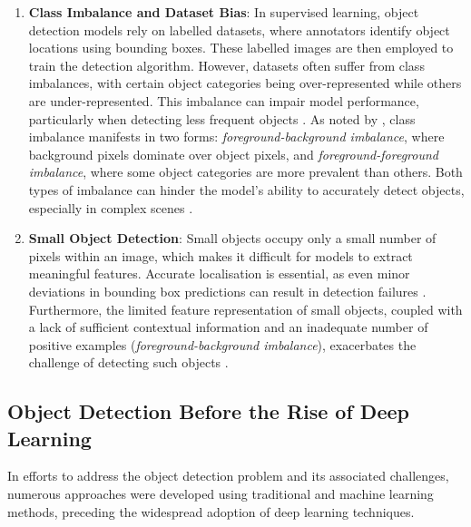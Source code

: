 \begin{enumerate}[label=\textbf{\arabic*.}]
    \item \textbf{Class Imbalance and Dataset Bias}: In supervised learning, object detection models rely on labelled datasets, where annotators identify object locations using bounding boxes. These labelled images are then employed to train the detection algorithm. However, datasets often suffer from class imbalances, with certain object categories being over-represented while others are under-represented. This imbalance can impair model performance, particularly when detecting less frequent objects \cite{od_survey_problems}. As noted by \cite{imbalance}, class imbalance manifests in two forms: \textit{foreground-background imbalance}, where background pixels dominate over object pixels, and \textit{foreground-foreground imbalance}, where some object categories are more prevalent than others. Both types of imbalance can hinder the model’s ability to accurately detect objects, especially in complex scenes \cite{od_survey_problems, imbalance}.

    \item \textbf{Small Object Detection}: Small objects occupy only a small number of pixels within an image, which makes it difficult for models to extract meaningful features. Accurate localisation is essential, as even minor deviations in bounding box predictions can result in detection failures \cite{od_survey_problems}. Furthermore, the limited feature representation of small objects, coupled with a lack of sufficient contextual information and an inadequate number of positive examples (\textit{foreground-background imbalance}), exacerbates the challenge of detecting such objects \cite{small_detection_survey, four_pillars_od}. 
\end{enumerate}

\subsection{Object Detection Before the Rise of Deep Learning}
\label{subsec:2_detection_pre_dl}

In efforts to address the object detection problem and its associated challenges, numerous approaches were developed using traditional and machine learning methods, preceding the widespread adoption of deep learning techniques.

